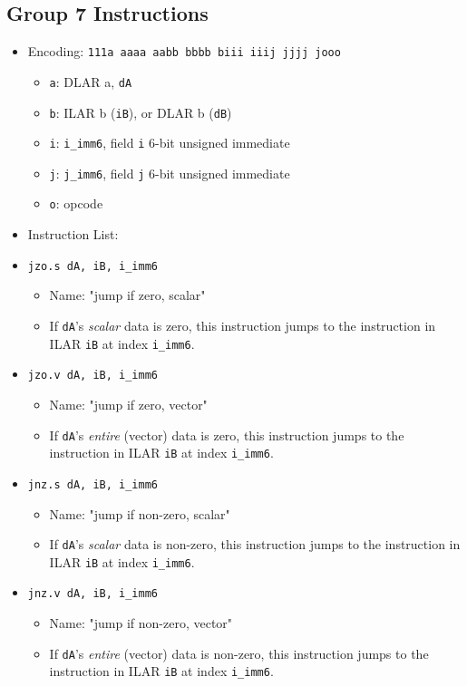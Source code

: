 \documentclass{article}
\begin{document}
	\subsection{Group 7 Instructions}
		\begin{itemize}
		\item Encoding:  \texttt{111a aaaa aabb bbbb  biii iiij jjjj jooo}
			\begin{itemize}
			\item \texttt{a}:  DLAR a, \texttt{dA}
			\item \texttt{b}:  ILAR b (\texttt{iB}), or DLAR b
				(\texttt{dB})
			\item \texttt{i}:  \texttt{i\_imm6}, field \texttt{i} 6-bit
				unsigned immediate
			\item \texttt{j}:  \texttt{j\_imm6}, field \texttt{j} 6-bit
				unsigned immediate
			\item \texttt{o}:  opcode
			\end{itemize}
		\item Instruction List:
			\item \texttt{jzo.s dA, iB, i\_imm6}
				\begin{itemize}
				\item Name:  "jump if zero, scalar"
				\item If \texttt{dA}'s \textit{scalar} data is zero, this
					instruction jumps to the instruction in ILAR
					\texttt{iB} at index \texttt{i\_imm6}.
				\end{itemize}
			\item \texttt{jzo.v dA, iB, i\_imm6}
				\begin{itemize}
				\item Name:  "jump if zero, vector"
				\item If \texttt{dA}'s \textit{entire} (vector) data is
					zero, this instruction jumps to the instruction in ILAR
					\texttt{iB} at index \texttt{i\_imm6}.
				\end{itemize}

			\item \texttt{jnz.s dA, iB, i\_imm6}
				\begin{itemize}
				\item Name:  "jump if non-zero, scalar"
				\item If \texttt{dA}'s \textit{scalar} data is non-zero,
					this instruction jumps to the instruction in ILAR
					\texttt{iB} at index \texttt{i\_imm6}.
				\end{itemize}
			\item \texttt{jnz.v dA, iB, i\_imm6}
				\begin{itemize}
				\item Name:  "jump if non-zero, vector"
				\item If \texttt{dA}'s \textit{entire} (vector) data is
					non-zero, this instruction jumps to the instruction in
					ILAR \texttt{iB} at index \texttt{i\_imm6}.
				\end{itemize}


\end{itemize}
\end{document}
